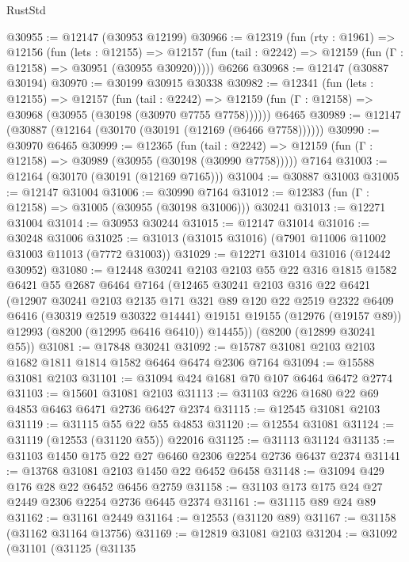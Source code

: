 \begin{lexlean}{RustStd}
\begin{coremodule}
@30955 := @12147 (@30953 @12199)
@30966 := @12319
    (fun (rty : @1961) =>
    @12156
      (fun (lets : @12155) =>
      @12157 (fun (tail : @2242) => @12159 (fun (Γ : @12158) => @30951 (@30955 @30920)))))
    @6266
@30968 := @12147 (@30887 @30194)
@30970 := @30199 @30915 @30338
@30982 := @12341
    (fun (lets : @12155) =>
    @12157
      (fun (tail : @2242) =>
      @12159 (fun (Γ : @12158) => @30968 (@30955 (@30198 (@30970 @7755 @7758))))))
    @6465
@30989 := @12147 (@30887 (@12164 (@30170 (@30191 (@12169 (@6466 @7758))))))
@30990 := @30970 @6465
@30999 := @12365
    (fun (tail : @2242) => @12159 (fun (Γ : @12158) => @30989 (@30955 (@30198 (@30990 @7758)))))
    @7164
@31003 := @12164 (@30170 (@30191 (@12169 @7165)))
@31004 := @30887 @31003
@31005 := @12147 @31004
@31006 := @30990 @7164
@31012 := @12383 (fun (Γ : @12158) => @31005 (@30955 (@30198 @31006))) @30241
@31013 := @12271 @31004
@31014 := @30953 @30244
@31015 := @12147 @31014
@31016 := @30248 @31006
@31025 := @31013 (@31015 @31016) (@7901 @11006 @11002 @31003 @11013 (@7772 @31003))
@31029 := @12271 @31014 @31016 (@12442 @30952)
@31080 := @12448
    @30241
    @2103
    @2103
    @55
    @22
    @316
    @1815
    @1582
    @6421
    @55
    @2687
    @6464
    @7164
    (@12465
      @30241
      @2103
      @316
      @22
      @6421
      (@12907
        @30241
        @2103
        @2135
        @171
        @321
        @89
        @120
        @22
        @2519
        @2322
        @6409
        @6416
        (@30319 @2519 @30322 @14441)
        @19151
        @19155
        (@12976 (@19157 @89))
        @12993
        (@8200 (@12995 @6416 @6410))
        @14455))
    (@8200 (@12899 @30241 @55))
@31081 := @17848 @30241
@31092 := @15787 @31081 @2103 @2103 @1682 @1811 @1814 @1582 @6464 @6474 @2306 @7164
@31094 := @15588 @31081 @2103
@31101 := @31094 @424 @1681 @70 @107 @6464 @6472 @2774
@31103 := @15601 @31081 @2103
@31113 := @31103 @226 @1680 @22 @69 @4853 @6463 @6471 @2736 @6427 @2374
@31115 := @12545 @31081 @2103
@31119 := @31115 @55 @22 @55 @4853
@31120 := @12554 @31081
@31124 := @31119 (@12553 (@31120 @55)) @22016
@31125 := @31113 @31124
@31135 := @31103 @1450 @175 @22 @27 @6460 @2306 @2254 @2736 @6437 @2374
@31141 := @13768 @31081 @2103 @1450 @22 @6452 @6458
@31148 := @31094 @429 @176 @28 @22 @6452 @6456 @2759
@31158 := @31103 @173 @175 @24 @27 @2449 @2306 @2254 @2736 @6445 @2374
@31161 := @31115 @89 @24 @89
@31162 := @31161 @2449
@31164 := @12553 (@31120 @89)
@31167 := @31158 (@31162 @31164 @13756)
@31169 := @12819 @31081 @2103
@31204 := @31092
    (@31101
      (@31125
        (@31135

\end{coremodule}
\end{lexlean}
